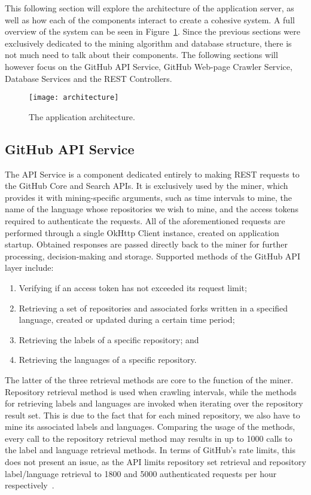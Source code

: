 This following section will explore the architecture of the application server, as well as how each of the components interact to create a cohesive system.
A full overview of the system can be seen in Figure~\ref{fig:2}.
Since the previous sections were exclusively dedicated to the mining algorithm and database structure, there is not much need to talk about their components.
The following sections will however focus on the GitHub API Service, GitHub Web-page Crawler Service, Database Services and the REST Controllers.

\begin{figure}[h!]
    \centering
    \texttt{[image: architecture]}
    \caption[Application architecture]{The application architecture.}
    \label{fig:2}
\end{figure}

\subsection{GitHub API Service}

The API Service is a component dedicated entirely to making REST requests to the GitHub Core and Search APIs.
It is exclusively used by the miner, which provides it with mining-specific arguments, such as time intervals to mine, the name of the language whose repositories we wish to mine, and the access tokens required to authenticate the requests.
All of the aforementioned requests are performed through a single OkHttp Client instance, created on application startup.
Obtained responses are passed directly back to the miner for further processing, decision-making and storage.
Supported methods of the GitHub API layer include:
\begin{enumerate}
    \item Verifying if an access token has not exceeded its request limit;
    \item Retrieving a set of repositories and associated forks written in a specified language, created or updated during a certain time period;
    \item Retrieving the labels of a specific repository; and
    \item Retrieving the languages of a specific repository.
\end{enumerate}

The latter of the three retrieval methods are core to the function of the miner.
Repository retrieval method is used when crawling intervals, while the methods for retrieving labels and languages are invoked when iterating over the repository result set.
This is due to the fact that for each mined repository, we also have to mine its associated labels and languages.
Comparing the usage of the methods, every call to the repository retrieval method may results in up to 1000 calls to the label and language retrieval methods.
In terms of GitHub's rate limits, this does not present an issue, as the API limits repository set retrieval and repository label/language retrieval to 1800 and 5000 authenticated requests per hour respectively~\cite{APISEARCH,RATELIMIT}.

